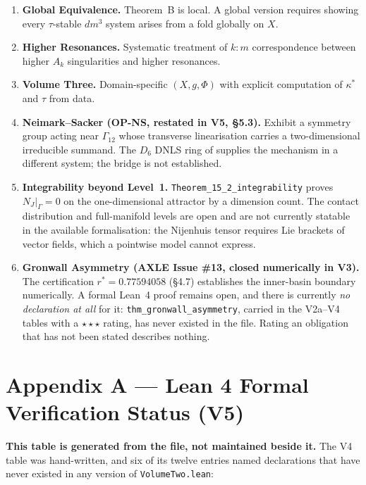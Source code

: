 \documentclass[11pt]{article}
\theoremstyle{boxed}
\begin{document}
\begin{enumerate}
  \item \textbf{Global Equivalence.} Theorem~B is local. A global version requires
        showing every $\tau$-stable $dm^3$ system arises from a fold globally on $X$.
  \item \textbf{Higher Resonances.} Systematic treatment of $k{:}m$ correspondence
        between higher $A_k$ singularities and higher resonances.
  \item \textbf{Volume Three.} Domain-specific $(X, g, \Phi)$ with explicit computation
        of $\kappa^{*}$ and $\tau$ from data.
  \item \textbf{Neimark--Sacker (OP-NS, restated in V5, \S 5.3).} Exhibit a symmetry group
        acting near $\Gamma_{12}$ whose transverse linearisation carries a two-dimensional
        irreducible summand. The $D_6$ DNLS ring of \cite{wp77} supplies the mechanism in a
        different system; the bridge is not established.
  \item \textbf{Integrability beyond Level~1.} \texttt{Theorem\_15\_2\_integrability} proves
        $N_J|_\Gamma = 0$ on the one-dimensional attractor by a dimension count. The contact
        distribution and full-manifold levels are open and are not currently statable in the
        available formalisation: the Nijenhuis tensor requires Lie brackets of vector fields, which
        a pointwise model cannot express.
  \item \textbf{Gronwall Asymmetry (AXLE Issue \#13, closed numerically in V3).} The
        certification $r^{*} = 0.77594058$ (\S 4.7) establishes the inner-basin boundary
        numerically. A formal Lean~4 proof remains open, and there is currently \emph{no
        declaration at all} for it: \texttt{thm\_gronwall\_asymmetry}, carried in the
        V2a--V4 tables with a $\star\star\star$ rating, has never existed in the file.
        Rating an obligation that has not been stated describes nothing.
\end{enumerate}

\section*{Appendix A --- Lean 4 Formal Verification Status (V5)}

\textbf{This table is generated from the file, not maintained beside it.} The V4 table was
hand-written, and six of its twelve entries named declarations that have never existed in any
version of \texttt{VolumeTwo.lean}:
\end{document}
